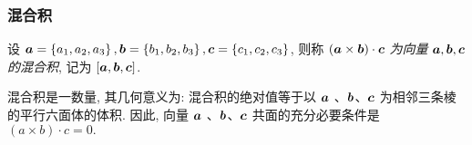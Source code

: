 % 
% 

\subsubsection{混合积}

\begin{definition}[向量的混合积]
    设 $ \vb*{a}=\left\{a_{1}, a_{2}, a_{3}\right\}, \vb*{b}=\left\{b_{1}, b_{2}, b_{3}\right\}, \vb*{c}=\left\{c_{1}, c_{2}, c_{3}\right\}$,
    则称 $ (\vb*{a} \times \vb*{b}) \cdot \vb*{c} $ \textit{为向量} $ \vb*{a}, \vb*{b}, \vb*{c} $ \textit{的混合积}, 记为 $ [\vb*{a}, \vb*{b}, \vb*{c}] $.
\end{definition}

\begin{theorem}[共面条件]
    混合积是一数量, 其几何意义为: 混合积的绝对值等于以 $ \vb*{a}$ 、$ \vb*{b} $、$ \vb*{c} $ 为相邻三条棱的平行六面体的体积.
    因此, 向量 $ \vb*{a}$ 、$ \vb*{b} $、$ \vb*{c} $ 共面的充分必要条件是 $ (a \times b) \cdot c=0 .$
\end{theorem}